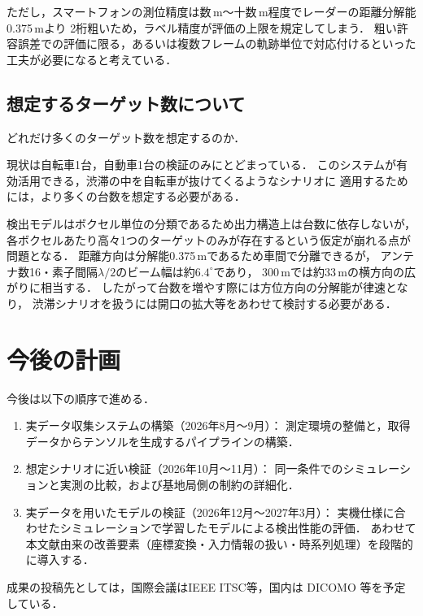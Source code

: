 \documentclass[a4paper,10.5pt,dvipdfmx]{jsarticle}
\begin{document}
ただし，スマートフォンの測位精度は数\,m〜十数\,m程度でレーダーの距離分解能0.375\,mより
2桁粗いため，ラベル精度が評価の上限を規定してしまう．
粗い許容誤差での評価に限る，あるいは複数フレームの軌跡単位で対応付けるといった
工夫が必要になると考えている．

\subsection{想定するターゲット数について}

どれだけ多くのターゲット数を想定するのか．

現状は自転車1台，自動車1台の検証のみにとどまっている．
このシステムが有効活用できる，渋滞の中を自転車が抜けてくるようなシナリオに
適用するためには，より多くの台数を想定する必要がある．

検出モデルはボクセル単位の分類であるため出力構造上は台数に依存しないが，
各ボクセルあたり高々1つのターゲットのみが存在するという仮定が崩れる点が問題となる．
距離方向は分解能0.375\,mであるため車間で分離できるが，
アンテナ数16・素子間隔$\lambda/2$のビーム幅は約$6.4^\circ$であり，
300\,mでは約33\,mの横方向の広がりに相当する．
したがって台数を増やす際には方位方向の分解能が律速となり，
渋滞シナリオを扱うには開口の拡大等をあわせて検討する必要がある．

\section{今後の計画}

今後は以下の順序で進める．

\begin{enumerate}
  \item 実データ収集システムの構築（2026年8月〜9月）：
        測定環境の整備と，取得データからテンソルを生成するパイプラインの構築．
  \item 想定シナリオに近い検証（2026年10月〜11月）：
        同一条件でのシミュレーションと実測の比較，および基地局側の制約の詳細化．
  \item 実データを用いたモデルの検証（2026年12月〜2027年3月）：
        実機仕様に合わせたシミュレーションで学習したモデルによる検出性能の評価．
        あわせて本文献由来の改善要素（座標変換・入力情報の扱い・時系列処理）を段階的に導入する．
\end{enumerate}

成果の投稿先としては，国際会議はIEEE ITSC等，国内は DICOMO 等を予定している．



\end{document}
